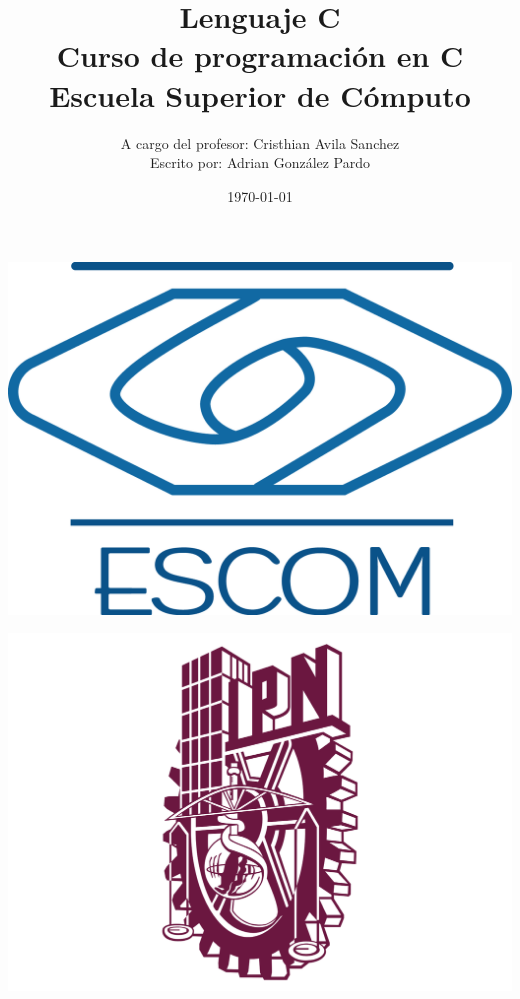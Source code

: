 \documentclass[10pt,executivepaper]{article}
\title{Lenguaje C\\Curso de programación en C\\Escuela Superior de Cómputo}
\author{A cargo del profesor: Cristhian Avila Sanchez\\Escrito por: Adrian González Pardo}
\date{\today}
\begin{document}
\begin{minipage}{0.4\textwidth}
	\begin{flushleft}
		\includegraphics[scale = 0.05]{logoescom.png}
	\end{flushleft}
\end{minipage}
\begin{minipage}{0.51\textwidth}
	\begin{flushright}
		\includegraphics[scale = 0.055]{logoipn.png}
	\end{flushright}
\end{minipage}
\end{document}
